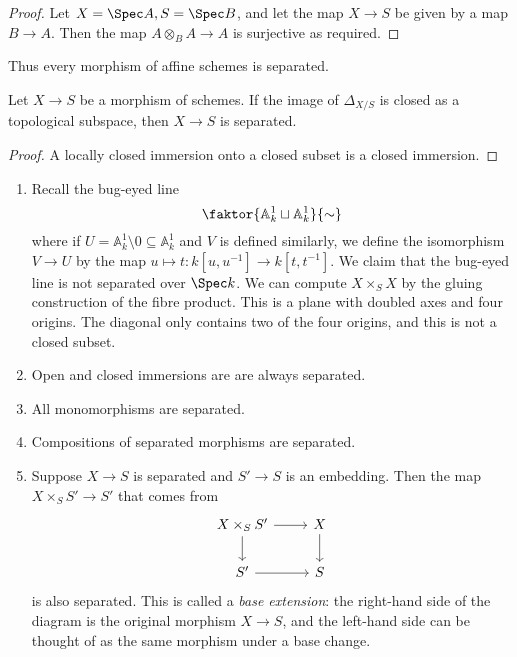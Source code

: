 \begin{proof}
    Let \( X = \Spec A, S = \Spec B \), and let the map \( X \to S \) be given by a map \( B \to A \).
    Then the map \( A \otimes_B A \to A \) is surjective as required.
\end{proof}
Thus every morphism of affine schemes is separated.
\begin{corollary}
    Let \( X \to S \) be a morphism of schemes.
    If the image of \( \Delta_{X/S} \) is closed as a topological subspace, then \( X \to S \) is separated.
\end{corollary}
\begin{proof}
    A locally closed immersion onto a closed subset is a closed immersion.
\end{proof}
\begin{example}
    \begin{enumerate}
        \item Recall the bug-eyed line
        \[ \faktor{\mathbb A^1_k \sqcup \mathbb A^1_k} {\sim} \]
        where if \( U = \mathbb A^1_k \setminus \qty{0} \subseteq \mathbb A^1_k \) and \( V \) is defined similarly, we define the isomorphism \( V \to U \) by the map \( u \mapsto t : k[u,u^{-1}] \to k[t,t^{-1}] \).
        We claim that the bug-eyed line is not separated over \( \Spec k \).
        We can compute \( X \times_S X \) by the gluing construction of the fibre product.
        This is a plane with doubled axes and four origins.
        The diagonal only contains two of the four origins, and this is not a closed subset.
        \item Open and closed immersions are are always separated.
        \item All monomorphisms are separated.
        \item Compositions of separated morphisms are separated.
        \item Suppose \( X \to S \) is separated and \( S' \to S \) is an embedding.
        Then the map \( X \times_S S' \to S' \) that comes from
\[\begin{tikzcd}
	{X \times_S S'} & X \\
	{S'} & S
	\arrow[from=1-1, to=1-2]
	\arrow[from=1-2, to=2-2]
	\arrow[from=1-1, to=2-1]
	\arrow[from=2-1, to=2-2]
\end{tikzcd}\]
        is also separated.
        This is called a \emph{base extension}: the right-hand side of the diagram is the original morphism \( X \to S \), and the left-hand side can be thought of as the same morphism under a base change.
    \end{enumerate}
\end{example}
